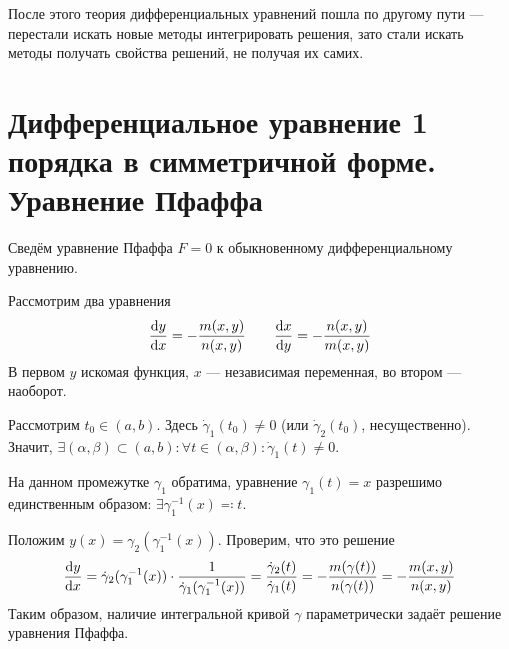 \documentclass[a4paper]{report}
\begin{document}
    После этого теория дифференциальных уравнений пошла по другому пути --- перестали искать новые методы интегрировать решения, зато стали искать методы получать свойства решений, не получая их самих.



    \section{Дифференциальное уравнение 1 порядка в симметричной форме. Уравнение Пфаффа}

    Сведём уравнение Пфаффа $F = 0$ к обыкновенному дифференциальному уравнению.

    Рассмотрим два уравнения
    \[\frac{\operatorname{d}\! y}{\operatorname{d}\! x} = -\frac{m(x, y)}{n(x, y)} \qquad \frac{\operatorname{d}\! x}{\operatorname{d}\! y} = -\frac{n(x, y)}{m(x, y)}\]
    В первом $y$ искомая функция, $x$ --- независимая переменная, во втором --- наоборот.

    Рассмотрим $t_0 \in (a, b)$.
    Здесь $\dot{\gamma}_1(t_0) \ne 0$ (или $\dot{\gamma}_2(t_0)$, несущественно).
    Значит, $\exists (\alpha, \beta) \subset (a, b): \forall t \in (\alpha, \beta): \dot{\gamma}_1(t) \ne 0$.

    На данном промежутке $\gamma_1$ обратима, уравнение $\gamma_1(t) = x$ разрешимо единственным образом: $\exists \gamma_1^{-1}(x) \eqqcolon t$.

    Положим $y(x) = \gamma_2(\gamma_1^{-1}(x))$.
    Проверим, что это решение
    \[\frac{\operatorname{d}\! y}{\operatorname{d}\! x} = \dot{\gamma}_2(\gamma_1^{-1}(x)) \cdot \frac{1}{\dot{\gamma}_1(\gamma_1^{-1}(x))} = \frac{\dot{\gamma}_2(t)}{\dot{\gamma}_1(t)} = -\frac{m(\gamma(t))}{n(\gamma(t))} = -\frac{m(x, y)}{n(x, y)}\]
    Таким образом, наличие интегральной кривой $\gamma$ параметрически задаёт решение уравнения Пфаффа.

\end{document}
